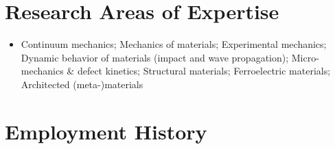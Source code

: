 \documentclass[a4paper,10pt, oneside]{article}
\begin{document}
	\section*{{Research Areas of Expertise}}
	\begin{itemize}[wide, labelwidth=!, labelindent=-1em]
		\item[]Continuum mechanics; Mechanics of materials; Experimental mechanics; Dynamic behavior of materials (impact and wave propagation); Micro-mechanics \& defect kinetics; Structural materials; Ferroelectric materials; Architected (meta-)materials
	\end{itemize}
	
	\section*{Employment History}
\end{document}
